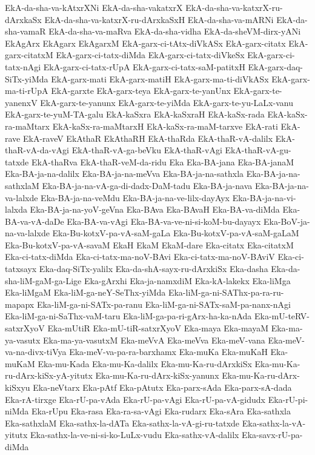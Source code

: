 {EkA-da-sha-va-kAtxrXNi
EkA-da-sha-vakatxrX
EkA-da-sha-va-katxrX-ru-dArxkaSx
EkA-da-sha-va-katxrX-ru-dArxkaSxH
EkA-da-sha-va-mARNi
EkA-da-sha-vamaR
EkA-da-sha-va-maRva
EkA-da-sha-vidha
EkA-da-sheVM-dirx-yANi
EkAgArx
EkAgarx
EkAgarxM
EkA-garx-ci-tAtx-diVkASx
EkA-garx-citatx
EkA-garx-citatxM
EkA-garx-ci-tatx-diMda
EkA-garx-ci-tatx-diVkeSx
EkA-garx-ci-tatx-nAgi
EkA-garx-ci-tatx-rUpA
EkA-garx-ci-tatx-saM-patitxH
EkA-garx-daq-SiTx-yiMda
EkA-garx-mati
EkA-garx-matiH
EkA-garx-ma-ti-diVkASx
EkA-garx-ma-ti-rUpA
EkA-garxte
EkA-garx-teya
EkA-garx-te-yanUnx
EkA-garx-te-yanenxV
EkA-garx-te-yanunx
EkA-garx-te-yiMda
EkA-garx-te-yu-LaLx-vanu
EkA-garx-te-yuM-TA-galu
EkA-kaSxra
EkA-kaSxraH
EkA-kaSx-rada
EkA-kaSx-ra-maMtarx
EkA-kaSx-ra-maMtarxH
EkA-kaSx-ra-maM-tarxve
EkA-rati
EkA-rave
EkA-raveV
EkAthaR
EkAthaRH
EkA-thaRda
EkA-thaR-vA-dalilx
EkA-thaR-vA-da-vAgi
EkA-thaR-vA-ga-beVku
EkA-thaR-vAgi
EkA-thaR-vA-gu-tatxde
EkA-thaRva
EkA-thaR-veM-da-ridu
Eka
Eka-BA-jana
Eka-BA-janaM
Eka-BA-ja-na-dalilx
Eka-BA-ja-na-meVva
Eka-BA-ja-na-sathxla
Eka-BA-ja-na-sathxlaM
Eka-BA-ja-na-vA-ga-di-dadx-DaM-tadu
Eka-BA-ja-nava
Eka-BA-ja-na-va-lalxde
Eka-BA-ja-na-veMdu
Eka-BA-ja-na-ve-lilx-dayAyx
Eka-BA-ja-na-vi-lalxda
Eka-BA-ja-na-yoV-geVna
Eka-BAva
Eka-BAvaH
Eka-BA-va-diMda
Eka-BA-va-vA-daDe
Eka-BA-va-vAgi
Eka-BA-va-ve-ni-si-koM-bu-dayayx
Eka-BoV-ja-na-va-lalxde
Eka-Bu-kotxV-pa-vA-saM-gaLa
Eka-Bu-kotxV-pa-vA-saM-gaLaM
Eka-Bu-kotxV-pa-vA-savaM
EkaH
EkaM
EkaM-dare
Eka-citatx
Eka-citatxM
Eka-ci-tatx-diMda
Eka-ci-tatx-ma-noV-BAvi
Eka-ci-tatx-ma-noV-BAviV
Eka-ci-tatxsayx
Eka-daq-SiTx-yalilx
Eka-da-shA-sayx-ru-dArxkiSx
Eka-dasha
Eka-da-sha-liM-gaM-ga-Lige
Eka-gArxhi
Eka-ja-namxdiM
Eka-kA-lakekx
Eka-liMga
Eka-liMgaM
Eka-liM-ga-neY-SeThx-yiMda
Eka-liM-ga-ni-SAThx-pa-ra-ru-mapapx
Eka-liM-ga-ni-SATx-pa-ranu
Eka-liM-ga-ni-SATx-saM-pa-nanx-nAgi
Eka-liM-ga-ni-SaThx-vaM-taru
Eka-liM-ga-pa-ri-gArx-ha-ka-nAda
Eka-mU-teRV-satxrXyoV
Eka-mUtiR
Eka-mU-tiR-satxrXyoV
Eka-maya
Eka-mayaM
Eka-ma-ya-vasutx
Eka-ma-ya-vasutxM
Eka-meVvA
Eka-meVva
Eka-meV-vana
Eka-meV-va-na-divx-tiVya
Eka-meV-va-pa-ra-barxhamx
Eka-muKa
Eka-muKaH
Eka-muKaM
Eka-mu-Kada
Eka-mu-Ka-dalilx
Eka-mu-Ka-ru-dArxkiSx
Eka-mu-Ka-ru-dArx-kiSx-yA-yitutx
Eka-mu-Ka-ru-dArx-kiSx-yanunx
Eka-mu-Ka-ru-dArx-kiSxyu
Eka-neVtarx
Eka-pAtf
Eka-pAtutx
Eka-parx-sAda
Eka-parx-sA-dada
Eka-rA-tirxge
Eka-rU-pa-vAda
Eka-rU-pa-vAgi
Eka-rU-pa-vA-gidudx
Eka-rU-pi-niMda
Eka-rUpu
Eka-rasa
Eka-ra-sa-vAgi
Eka-rudarx
Eka-sAra
Eka-sathxla
Eka-sathxlaM
Eka-sathx-la-dATa
Eka-sathx-la-vA-gi-ru-tatxde
Eka-sathx-la-vA-yitutx
Eka-sathx-la-ve-ni-si-ko-LuLx-vudu
Eka-sathx-vA-dalilx
Eka-savx-rU-pa-diMda
}
